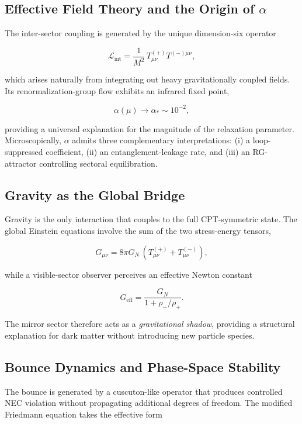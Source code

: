 \documentclass[11pt,a4paper]{article}
\begin{document}
\subsection*{Effective Field Theory and the Origin of \texorpdfstring{$\alpha$}{alpha}}

The inter-sector coupling is generated by the unique dimension-six operator

\[
\mathcal{L}_{\mathrm{int}}
    = \frac{1}{M^{2}}\, T^{(+)}_{\mu\nu} T^{(-)\mu\nu},
\]

which arises naturally from integrating out heavy gravitationally coupled fields.
Its renormalization-group flow exhibits an infrared fixed point,

\[
\alpha(\mu) \longrightarrow \alpha_{*} \sim 10^{-2},
\]

providing a universal explanation for the magnitude of the relaxation parameter.
Microscopically, \( \alpha \) admits three complementary interpretations:
(i) a loop-suppressed coefficient, (ii) an entanglement-leakage rate, and
(iii) an RG-attractor controlling sectoral equilibration.

\subsection*{Gravity as the Global Bridge}

Gravity is the only interaction that couples to the full CPT-symmetric state.
The global Einstein equations involve the sum of the two stress-energy tensors,

\[
G_{\mu\nu} = 8\pi G_{N}\,(T^{(+)}_{\mu\nu} + T^{(-)}_{\mu\nu}),
\]

while a visible-sector observer perceives an effective Newton constant

\[
G_{\mathrm{eff}}
    = \frac{G_{N}}{1 + \rho_{-}/\rho_{+}}.
\]

The mirror sector therefore acts as a \emph{gravitational shadow}, providing a
structural explanation for dark matter without introducing new particle species.

\subsection*{Bounce Dynamics and Phase-Space Stability}

The bounce is generated by a cuscuton-like operator that produces controlled
NEC violation without propagating additional degrees of freedom. The modified
Friedmann equation takes the effective form
\end{document}
